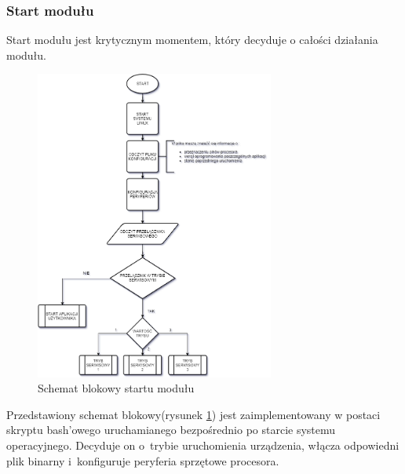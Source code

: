 \documentclass[12pt, eng, twoside, openany, final]{mgr}
\begin{document}
                    \subsubsection{Start modułu}
                    Start modułu jest krytycznym momentem, który decyduje o całości działania modułu.
                        \begin{figure}[H]
                        \begin{center}
                            \includegraphics[width=0.7\textwidth]{startup.png}
                            \caption{Schemat blokowy startu modułu} \label{fig:startup}
                        \end{center}
                        \end{figure}
                Przedstawiony schemat blokowy(rysunek \ref{fig:startup}) jest zaimplementowany w postaci skryptu bash'owego uruchamianego bezpośrednio po starcie systemu operacyjnego. Decyduje on o~trybie uruchomienia urządzenia, włącza odpowiedni plik binarny i~konfiguruje peryferia sprzętowe procesora.
                \newpage
                        
\end{document}
